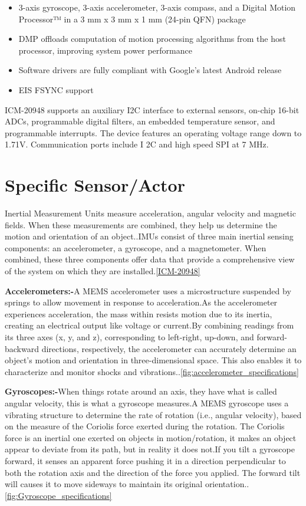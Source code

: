 \begin{itemize}
	\item  3-axis gyroscope, 3-axis accelerometer, 3-axis
	compass, and a Digital Motion Processor™ 
	in a 3 mm x 3 mm x 1 mm (24-pin QFN) package
	\item DMP offloads computation of motion processing
	algorithms from the host processor, improving
	system power performance
	\item Software drivers are fully compliant with Google’s
	latest Android release
	\item EIS FSYNC support
\end{itemize}

ICM-20948 supports an auxiliary I2C interface to external sensors, on-chip 16-bit ADCs, programmable digital filters, an embedded temperature sensor, and programmable interrupts. The device features an operating voltage range down to 1.71V. Communication ports include I 2C and high speed SPI at 7 MHz.


\section{Specific Sensor/Actor}


 Inertial Measurement Units measure acceleration, angular velocity and magnetic fields. When these measurements are combined, they help us determine the motion and orientation of an object.\cite{221e:2025}.IMUs consist of three main inertial sensing components: an accelerometer, a gyroscope, and a magnetometer. When combined, these three components offer data that provide a comprehensive view of the system on which they are installed.\ref{ICM-20948}

\textbf{Accelerometers:-}A MEMS accelerometer uses a microstructure suspended by springs to allow movement in response to acceleration.As the accelerometer experiences acceleration, the mass within resists motion due to its inertia, creating an electrical output like voltage or current.By combining readings from its three axes (x, y, and z), corresponding to left-right, up-down, and forward-backward directions, respectively, the accelerometer can accurately determine an object’s motion and orientation in three-dimensional space. This also enables it to characterize and monitor shocks and vibrations.\cite{221e:2025}.\ref{fig:accelerometer_specifications}

\textbf{Gyroscopes:-}When things rotate around an axis, they have what is called angular velocity, this is what a gyroscope measures.A MEMS gyroscope uses a vibrating structure to determine the rate of rotation (i.e., angular velocity), based on the measure of the Coriolis force exerted during the rotation. The Coriolis force is an inertial one exerted on objects in motion/rotation, it makes an object appear to deviate from its path, but in reality it does not.If you tilt a gyroscope forward, it senses an apparent force pushing it in a direction perpendicular to both the rotation axis and the direction of the force you applied. The forward tilt will causes it to move sideways to maintain its original orientation.\cite{221e:2025}.\ref{fig:Gyroscope_specifications}

